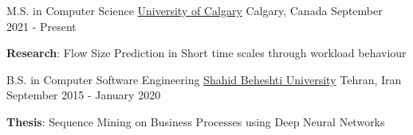 


\begin{cventries}

\cventry
{M.S. in Computer Science} %
{\href{https://ucalgary.ca}{University of Calgary}} %
{Calgary, Canada} %
{September 2021 - Present} %
{ %
\begin{cvitems}
\item {\textbf{Research}: Flow Size Prediction in Short time scales through workload behaviour}
\end{cvitems}
}

\cventry
{B.S. in Computer Software Engineering} %
{\href{https://sbu.ac.ir}{Shahid Beheshti University}} %
{Tehran, Iran} %
{September 2015 - January 2020} %
{ %
\begin{cvitems}
\item {\textbf{Thesis}: Sequence Mining on Business Processes using Deep Neural Networks}
\end{cvitems}
}



\end{cventries}
